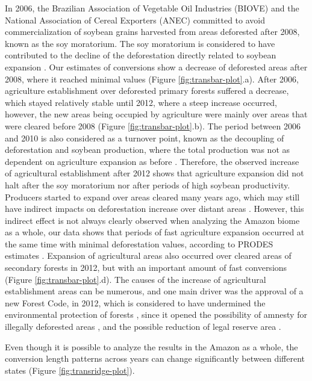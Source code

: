 \documentclass[essd, manuscript]{copernicus}
\begin{document}
In 2006, the Brazilian Association of Vegetable Oil Industries (BIOVE) and the National Association of Cereal Exporters (ANEC) committed to avoid commercialization of soybean grains harvested from areas deforested after 2008, known as the soy moratorium.
The soy moratorium is considered to have contributed to the decline of the deforestation directly related to soybean expansion \citep{Paim2021, Amaral2021, Heilmayr2020, Kastens2017}. Our estimates of conversions show a decrease of deforested areas after 2008, where it reached minimal values (Figure \ref{fig:transbar-plot}.a). After 2006, agriculture establishment over deforested primary forests suffered a decrease, which stayed relatively stable until 2012, where a steep increase occurred, however, the new areas being occupied by agriculture were mainly over areas that were cleared before 2008 (Figure \ref{fig:transbar-plot}.b). The period between 2006 and 2010 is also considered as a turnover point, known as the decoupling of deforestation and soybean production, where the total production was not as dependent on agriculture expansion as before \citep{Macedo2012}. Therefore, the observed increase of agricultural establishment after 2012 shows that agriculture expansion did not halt after the soy moratorium nor after periods of high soybean productivity. Producers started to expand over areas cleared many years ago, which may still have indirect impacts on deforestation increase over distant areas \citep{Arima2011, Gollnow2018}. However, this indirect effect is not always clearly observed when analyzing the Amazon biome as a whole, our data shows that periods of fast agriculture expansion occurred at the same time with minimal deforestation values, according to PRODES estimates \citep{Assis2019}. Expansion of agricultural areas also occurred over cleared areas of secondary forests in 2012, but with an important amount of fast conversions (Figure \ref{fig:transbar-plot}.d). The causes of the increase of agricultural establishment areas can be numerous, and one main driver was the approval of a new Forest Code, in 2012, which is considered to have undermined the environmental protection of forests \citep{Kroger2017, Pereira2019}, since it opened the possibility of amnesty for illegally deforested areas \citep{Schielein2018, Santanna2021, Filho2014}, and the possible reduction of legal reserve area \citep{Freitas2018}.

Even though it is possible to analyze the results in the Amazon as a whole, the conversion length patterns across years can change significantly between different states (Figure \ref{fig:transridge-plot}).
\end{document}
